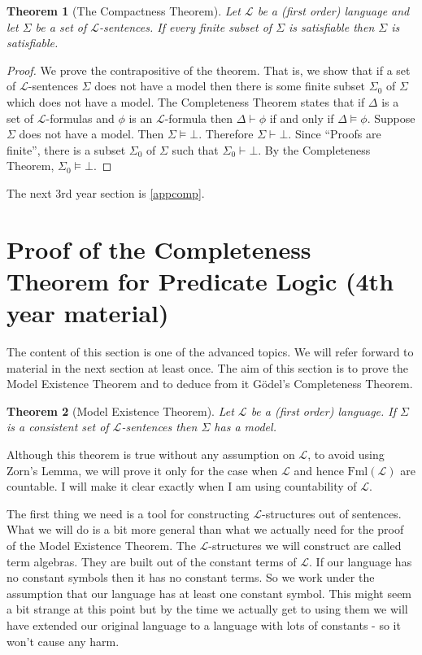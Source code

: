 \documentclass[11pt]{article}
\newcommand{\Fml}{\textrm{Fml}}
\newtheorem{theorem}{Theorem}[section]
\newcommand{\mcal}[1]{\mathcal{#1}}
\begin{document}
\begin{theorem}[The Compactness Theorem]
Let $\mcal{L}$ be a (first order) language and let $\Sigma$ be a set of $\mcal{L}$-sentences. If every finite subset of $\Sigma$ is satisfiable then $\Sigma$ is satisfiable.
\end{theorem}
\begin{proof}
We prove the contrapositive of the theorem. That is, we show that if a set of $\mcal{L}$-sentences $\Sigma$ does not have a model then there is some finite subset $\Sigma_0$ of $\Sigma$ which does not have a model. The Completeness Theorem states that if $\Delta$ is a set of $\mcal{L}$-formulas and $\phi$ is an $\mcal{L}$-formula then $\Delta\vdash \phi$ if and only if $\Delta\vDash \phi$. Suppose $\Sigma$ does not have a model. Then $\Sigma\vDash \bot$. Therefore $\Sigma\vdash\bot$. Since ``Proofs are finite'', there is a subset $\Sigma_0$ of $\Sigma$ such that $\Sigma_0\vdash\bot$. By the Completeness Theorem, $\Sigma_0\models \bot$.
\end{proof}

The next $3$rd year section is \ref{appcomp}.

\section{Proof of the Completeness Theorem for Predicate Logic (4th year material)}

The content of this section is one of the advanced topics. We will refer forward to material in the next section at least once. The aim of this section is to prove the Model Existence Theorem and to deduce from it G\"odel's Completeness Theorem.

\begin{theorem}[Model Existence Theorem]\label{ModelExThm}
Let $\mcal{L}$ be a (first order) language. If $\Sigma$ is a consistent set of $\mcal{L}$-sentences then $\Sigma$ has a model.
\end{theorem}

Although this theorem is true without any assumption on $\mcal{L}$, to avoid using Zorn's Lemma, we will prove it only for the case when $\mcal{L}$ and hence $\Fml(\mcal{L})$ are countable. I will make it clear exactly when I am using countability of $\mcal{L}$.

The first thing we need is a tool for constructing $\mcal{L}$-structures out of sentences. What we will do is a bit more general than what we actually need for the proof of the Model Existence Theorem. The $\mcal{L}$-structures we will construct are called term algebras. They are built out of the constant terms of $\mcal{L}$. If our language has no constant symbols then it has no constant terms. So we work under the assumption that our language has at least one constant symbol. This might seem a bit strange at this point but by the time we actually get to using them we will have extended our original language to a language with lots of constants - so it won't cause any harm.
\end{document}

